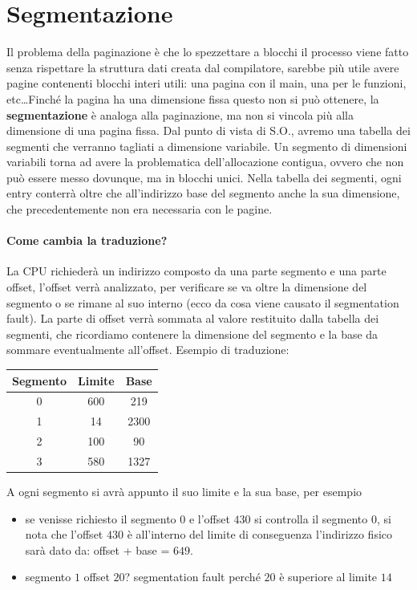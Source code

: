 \documentclass[a4paper, 12pt]{book}
\begin{document}
\section{Segmentazione}
Il problema della paginazione è che lo spezzettare a blocchi il processo viene fatto senza rispettare la struttura dati 
creata dal compilatore, sarebbe più utile avere pagine contenenti blocchi interi utili: una pagina con il main, una per le 
funzioni, etc\dots Finché la pagina ha una dimensione fissa questo non si può ottenere, la \textbf{segmentazione} è analoga alla 
paginazione, ma non si vincola più alla dimensione di una pagina fissa. Dal punto di vista di S.O., avremo una tabella dei segmenti 
che verranno tagliati a dimensione variabile. Un segmento di dimensioni variabili torna ad avere la problematica dell'allocazione 
contigua, ovvero che non può essere messo dovunque, ma in blocchi unici. Nella tabella dei segmenti, ogni entry conterrà oltre 
che all'indirizzo base del segmento anche la sua dimensione, che precedentemente non era necessaria con le pagine. 
\paragraph{Come cambia la traduzione?}
La CPU richiederà un indirizzo composto da una parte segmento e una parte offset, l'offset verrà analizzato, per verificare se 
va oltre la dimensione del segmento o se rimane al suo interno (ecco da cosa viene causato il segmentation fault). La parte di offset
verrà sommata al valore restituito dalla tabella dei segmenti, che ricordiamo contenere la dimensione del segmento e la base da sommare
eventualmente all'offset. Esempio di traduzione:
\begin{center}
    \begin{tabular}{| c | c | c |}  
        \hline
        Segmento & Limite & Base \\
        \hline
        0 & 600 & 219 \\
        \hline
        1 & 14 & 2300 \\
        \hline
        2 & 100 & 90 \\
        \hline
        3 & 580 & 1327 \\
        \hline      
    \end{tabular}
\end{center}

A ogni segmento si avrà appunto il suo limite e la sua base, per esempio

\begin{itemize}
    \item se venisse richiesto il segmento $0$ e l'offset $430$ 
    si controlla il segmento $0$, si nota che l'offset $430$ è all'interno del limite di conseguenza l'indirizzo fisico sarà dato da: 
    offset + base = $649$.
    \item segmento $1$ offset $20$? segmentation fault perché $20$ è superiore al limite $14$
\end{itemize} 
\end{document}
